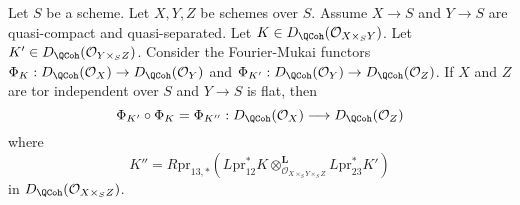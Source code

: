 \begin{lemma}
\label{lemma-compose-fourier-mukai}
Let $S$ be a scheme. Let $X, Y, Z$ be schemes over $S$. Assume
$X \to S$ and $Y \to S$ are quasi-compact and quasi-separated.
Let $K \in D_\QCoh(\mathcal{O}_{X \times_S Y})$.
Let $K' \in D_\QCoh(\mathcal{O}_{Y \times_S Z})$.
Consider the Fourier-Mukai functors
$\Phi_K : D_\QCoh(\mathcal{O}_X) \to D_\QCoh(\mathcal{O}_Y)$
and $\Phi_{K'} : D_\QCoh(\mathcal{O}_Y) \to D_\QCoh(\mathcal{O}_Z)$.
If $X$ and $Z$ are tor independent over $S$ and $Y \to S$ is flat,
then
$$
\Phi_{K'} \circ \Phi_K = \Phi_{K''} :
D_\QCoh(\mathcal{O}_X)
\longrightarrow
D_\QCoh(\mathcal{O}_Z)
$$
where
$$
K'' = R\text{pr}_{13, *}(
L\text{pr}_{12}^*K
\otimes_{\mathcal{O}_{X \times_S Y \times_S Z}}^\mathbf{L}
L\text{pr}_{23}^*K')
$$
in $D_\QCoh(\mathcal{O}_{X \times_S Z})$.
\end{lemma}

